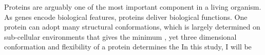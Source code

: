 Proteins are arguably one of the most important component in a living organism. As genes encode biological features, proteins deliver biological functions. One protein can adopt many structural conformations, which is largely determined on sub-cellular environments that gives the minimum  , yet three dimensional conformation and flexibility of a protein determines the     In this study, I will be 
